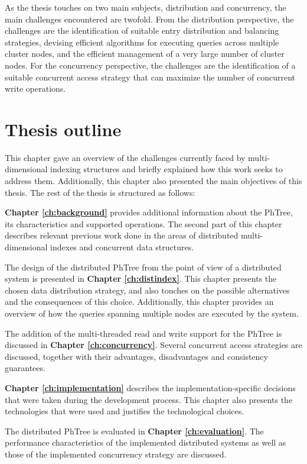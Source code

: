 \documentclass[11pt,a4paper]{globis-book}
\begin{document}
As the thesis touches on two main subjects, distribution and concurrency, the main challenges encountered are twofold. From the distribution perspective, the challenges are the identification of suitable entry distribution and balancing strategies, devising efficient algorithms for executing queries across multiple cluster nodes, and the efficient management of a very large number of cluster nodes. For the concurrency perspective, the challenges are the identification of a suitable concurrent access strategy that can maximize the number of concurrent write operations.

\section{Thesis outline}
\label{sec:intro-outline}

This chapter gave an overview of the challenges currently faced by multi-dimensional indexing structures and briefly explained how this work seeks to address them. Additionally, this chapter also presented the main objectives of this thesis. The rest of the thesis is structured as follows:

\textbf{Chapter \ref{ch:background}} provides additional information about the PhTree, its characteristics and supported operations. The second part of this chapter describes relevant previous work done in the areas of distributed multi-dimensional indexes and concurrent data structures.

The design of the distributed PhTree from the point of view of a distributed system is presented in \textbf{Chapter \ref{ch:distindex}}. This chapter presents the chosen data distribution strategy, and also touches on the possible alternatives and the consequences of this choice. Additionally, this chapter provides an overview of how the queries spanning multiple nodes are executed by the system.

The addition of the multi-threaded read and write support for the PhTree is discussed in \textbf{Chapter \ref{ch:concurrency}}. Several concurrent access strategies are discussed, together with their advantages, disadvantages and consistency guarantees.

\textbf{Chapter \ref{ch:implementation}} describes the implementation-specific decisions that were taken during the development process. This chapter also presents the technologies that were used and justifies the technological choices.

The distributed PhTree is evaluated in \textbf{Chapter \ref{ch:evaluation}}. The performance characteristics of the implemented distributed systems as well as those of the implemented concurrency strategy are discussed.
\end{document}
